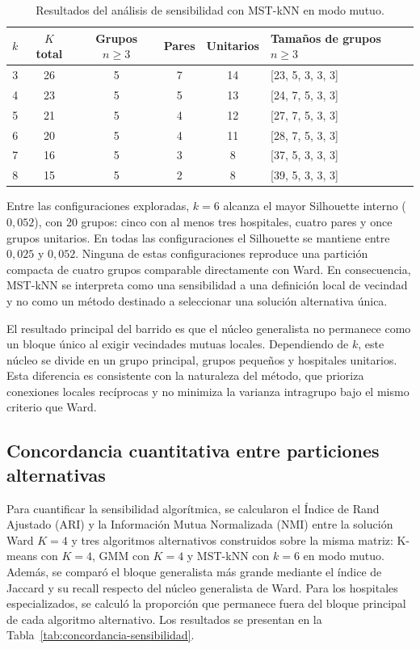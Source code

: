 \begin{table}[htbp]
\centering
\caption{Resultados del análisis de sensibilidad con MST-kNN en modo mutuo.}
\label{tab:mstknn-sensibilidad}

\begin{tabular}{c c c c c l}
\toprule
\textbf{$k$} & \textbf{$K$ total} & \textbf{Grupos $n\geq3$} & \textbf{Pares} & \textbf{Unitarios} & \textbf{Tamaños de grupos $n\geq3$} \\
\midrule
3 & 26 & 5 & 7 & 14 & [23, 5, 3, 3, 3] \\
4 & 23 & 5 & 5 & 13 & [24, 7, 5, 3, 3] \\
5 & 21 & 5 & 4 & 12 & [27, 7, 5, 3, 3] \\
6 & 20 & 5 & 4 & 11 & [28, 7, 5, 3, 3] \\
7 & 16 & 5 & 3 & 8 & [37, 5, 3, 3, 3] \\
8 & 15 & 5 & 2 & 8 & [39, 5, 3, 3, 3] \\
\bottomrule
\end{tabular}
\end{table}

Entre las configuraciones exploradas, $k=6$ alcanza el mayor Silhouette interno ($0{,}052$), con 20 grupos: cinco con al menos tres hospitales, cuatro pares y once grupos unitarios. En todas las configuraciones el Silhouette se mantiene entre $0{,}025$ y $0{,}052$. Ninguna de estas configuraciones reproduce una partición compacta de cuatro grupos comparable directamente con Ward. En consecuencia, MST-kNN se interpreta como una sensibilidad a una definición local de vecindad y no como un método destinado a seleccionar una solución alternativa única.

El resultado principal del barrido es que el núcleo generalista no permanece como un bloque único al exigir vecindades mutuas locales. Dependiendo de $k$, este núcleo se divide en un grupo principal, grupos pequeños y hospitales unitarios. Esta diferencia es consistente con la naturaleza del método, que prioriza conexiones locales recíprocas y no minimiza la varianza intragrupo bajo el mismo criterio que Ward.

\subsection*{Concordancia cuantitativa entre particiones alternativas}

Para cuantificar la sensibilidad algorítmica, se calcularon el Índice de Rand Ajustado (ARI) y la Información Mutua Normalizada (NMI) entre la solución Ward $K=4$ y tres algoritmos alternativos construidos sobre la misma matriz: K-means con $K=4$, GMM con $K=4$ y MST-kNN con $k=6$ en modo mutuo. Además, se comparó el bloque generalista más grande mediante el índice de Jaccard y su recall respecto del núcleo generalista de Ward. Para los hospitales especializados, se calculó la proporción que permanece fuera del bloque principal de cada algoritmo alternativo. Los resultados se presentan en la Tabla~\ref{tab:concordancia-sensibilidad}.

